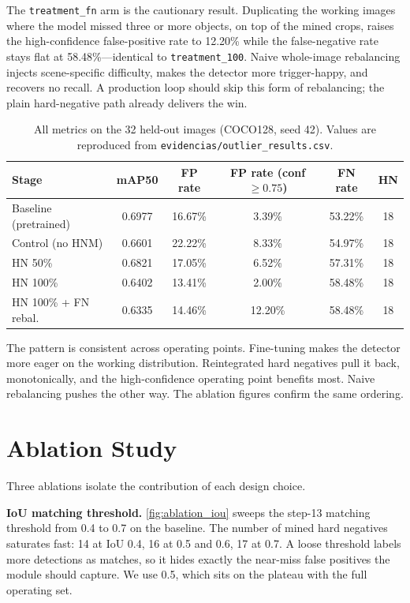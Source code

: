 \documentclass[conference]{IEEEtran}
\begin{document}
The \texttt{treatment\_fn} arm is the cautionary result. Duplicating the
working images where the model missed three or more objects, on top of the
mined crops, raises the high-confidence false-positive rate to 12.20\% while
the false-negative rate stays flat at 58.48\%---identical to
\texttt{treatment\_100}. Naive whole-image rebalancing injects scene-specific
difficulty, makes the detector more trigger-happy, and recovers no recall. A
production loop should skip this form of rebalancing; the plain hard-negative
path already delivers the win.

\begin{table}[htbp]
\caption{All metrics on the 32 held-out images (COCO128, seed 42). Values are
reproduced from \texttt{evidencias/outlier\_results.csv}.}
\label{tab:results}
\centering
\footnotesize
\begin{tabular}{lccccc}
\toprule
Stage & mAP50 & FP rate & FP rate (conf $\geq 0.75$) & FN rate & HN \\
\midrule
Baseline (pretrained)   & 0.6977 & 16.67\% & 3.39\% & 53.22\% & 18 \\
Control (no HNM)        & 0.6601 & 22.22\% & 8.33\% & 54.97\% & 18 \\
HN 50\%                 & 0.6821 & 17.05\% & 6.52\% & 57.31\% & 18 \\
HN 100\%                & 0.6402 & 13.41\% & 2.00\% & 58.48\% & 18 \\
HN 100\% + FN rebal.    & 0.6335 & 14.46\% & 12.20\% & 58.48\% & 18 \\
\bottomrule
\end{tabular}
\end{table}

The pattern is consistent across operating points. Fine-tuning makes the
detector more eager on the working distribution. Reintegrated hard negatives
pull it back, monotonically, and the high-confidence operating point benefits
most. Naive rebalancing pushes the other way. The ablation figures confirm the
same ordering.

\section{Ablation Study}
Three ablations isolate the contribution of each design choice.

\textbf{IoU matching threshold.} \cref{fig:ablation_iou} sweeps the step-13
matching threshold from 0.4 to 0.7 on the baseline. The number of mined hard
negatives saturates fast: 14 at IoU 0.4, 16 at 0.5 and 0.6, 17 at 0.7. A loose
threshold labels more detections as matches, so it hides exactly the near-miss
false positives the module should capture. We use 0.5, which sits on the
plateau with the full operating set.
\end{document}

